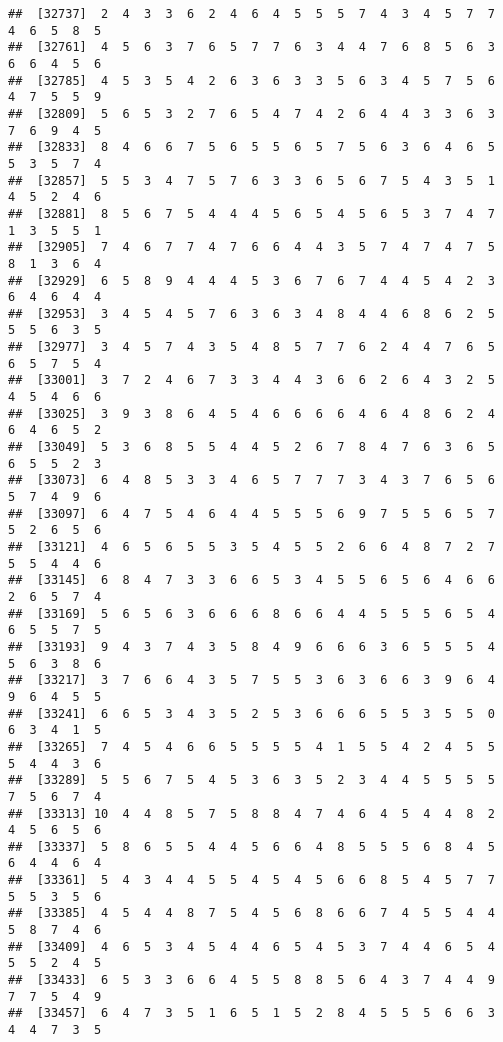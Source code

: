 \documentclass[
]{book}
\begin{document}
\begin{verbatim}
##  [32737]  2  4  3  3  6  2  4  6  4  5  5  5  7  4  3  4  5  7  7  4  6  5  8  5
##  [32761]  4  5  6  3  7  6  5  7  7  6  3  4  4  7  6  8  5  6  3  6  6  4  5  6
##  [32785]  4  5  3  5  4  2  6  3  6  3  3  5  6  3  4  5  7  5  6  4  7  5  5  9
##  [32809]  5  6  5  3  2  7  6  5  4  7  4  2  6  4  4  3  3  6  3  7  6  9  4  5
##  [32833]  8  4  6  6  7  5  6  5  5  6  5  7  5  6  3  6  4  6  5  5  3  5  7  4
##  [32857]  5  5  3  4  7  5  7  6  3  3  6  5  6  7  5  4  3  5  1  4  5  2  4  6
##  [32881]  8  5  6  7  5  4  4  4  5  6  5  4  5  6  5  3  7  4  7  1  3  5  5  1
##  [32905]  7  4  6  7  7  4  7  6  6  4  4  3  5  7  4  7  4  7  5  8  1  3  6  4
##  [32929]  6  5  8  9  4  4  4  5  3  6  7  6  7  4  4  5  4  2  3  6  4  6  4  4
##  [32953]  3  4  5  4  5  7  6  3  6  3  4  8  4  4  6  8  6  2  5  5  5  6  3  5
##  [32977]  3  4  5  7  4  3  5  4  8  5  7  7  6  2  4  4  7  6  5  6  5  7  5  4
##  [33001]  3  7  2  4  6  7  3  3  4  4  3  6  6  2  6  4  3  2  5  4  5  4  6  6
##  [33025]  3  9  3  8  6  4  5  4  6  6  6  6  4  6  4  8  6  2  4  6  4  6  5  2
##  [33049]  5  3  6  8  5  5  4  4  5  2  6  7  8  4  7  6  3  6  5  6  5  5  2  3
##  [33073]  6  4  8  5  3  3  4  6  5  7  7  7  3  4  3  7  6  5  6  5  7  4  9  6
##  [33097]  6  4  7  5  4  6  4  4  5  5  5  6  9  7  5  5  6  5  7  5  2  6  5  6
##  [33121]  4  6  5  6  5  5  3  5  4  5  5  2  6  6  4  8  7  2  7  5  5  4  4  6
##  [33145]  6  8  4  7  3  3  6  6  5  3  4  5  5  6  5  6  4  6  6  2  6  5  7  4
##  [33169]  5  6  5  6  3  6  6  6  8  6  6  4  4  5  5  5  6  5  4  6  5  5  7  5
##  [33193]  9  4  3  7  4  3  5  8  4  9  6  6  6  3  6  5  5  5  4  5  6  3  8  6
##  [33217]  3  7  6  6  4  3  5  7  5  5  3  6  3  6  6  3  9  6  4  9  6  4  5  5
##  [33241]  6  6  5  3  4  3  5  2  5  3  6  6  6  5  5  3  5  5  0  6  3  4  1  5
##  [33265]  7  4  5  4  6  6  5  5  5  5  4  1  5  5  4  2  4  5  5  5  4  4  3  6
##  [33289]  5  5  6  7  5  4  5  3  6  3  5  2  3  4  4  5  5  5  5  7  5  6  7  4
##  [33313] 10  4  4  8  5  7  5  8  8  4  7  4  6  4  5  4  4  8  2  4  5  6  5  6
##  [33337]  5  8  6  5  5  4  4  5  6  6  4  8  5  5  5  6  8  4  5  6  4  4  6  4
##  [33361]  5  4  3  4  4  5  5  4  5  4  5  6  6  8  5  4  5  7  7  5  5  3  5  6
##  [33385]  4  5  4  4  8  7  5  4  5  6  8  6  6  7  4  5  5  4  4  5  8  7  4  6
##  [33409]  4  6  5  3  4  5  4  4  6  5  4  5  3  7  4  4  6  5  4  5  5  2  4  5
##  [33433]  6  5  3  3  6  6  4  5  5  8  8  5  6  4  3  7  4  4  9  7  7  5  4  9
##  [33457]  6  4  7  3  5  1  6  5  1  5  2  8  4  5  5  5  6  6  3  4  4  7  3  5

\end{verbatim}
\end{document}
